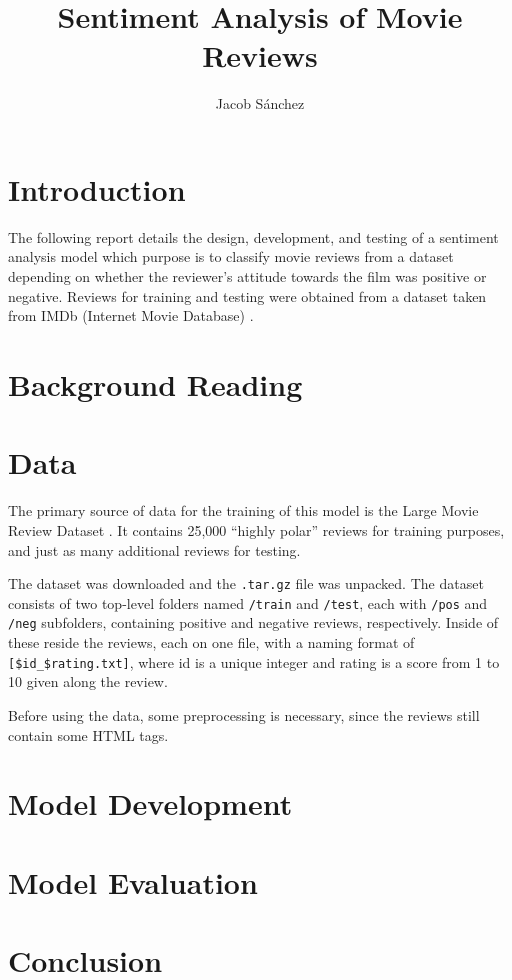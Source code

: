 \documentclass[a4paper,12pt]{article}
\title{Sentiment Analysis of Movie Reviews}
\author{Jacob Sánchez}
\date{} %
\begin{document}
\maketitle

\section{Introduction}

The following report details the design, development, and testing of a sentiment analysis model which purpose is to classify movie reviews from a dataset depending on whether the reviewer's attitude towards the film was positive or negative. Reviews for training and testing were obtained from a dataset taken from IMDb (Internet Movie Database) \parencite{maas2011ACL}.

\section{Background Reading}
\section{Data}

The primary source of data for the training of this model is the Large Movie Review Dataset \parencite{maas2011ACL}. It contains 25,000 \enquote{highly polar} reviews for training purposes, and just as many additional reviews for testing.

The dataset was downloaded and the {\tt .tar.gz} file was unpacked. The dataset consists of two top-level folders named {\tt /train} and {\tt /test}, each with {\tt /pos} and {\tt /neg} subfolders, containing positive and negative reviews, respectively. Inside of these reside the reviews, each on one file, with a naming format of {\tt [\$id\_\$rating.txt]}, where id is a unique integer and rating is a score from 1 to 10 given along the review.

Before using the data, some preprocessing is necessary, since the reviews still contain some HTML tags.

\section{Model Development}
\section{Model Evaluation}
\section{Conclusion}

\printbibliography
\end{document}
